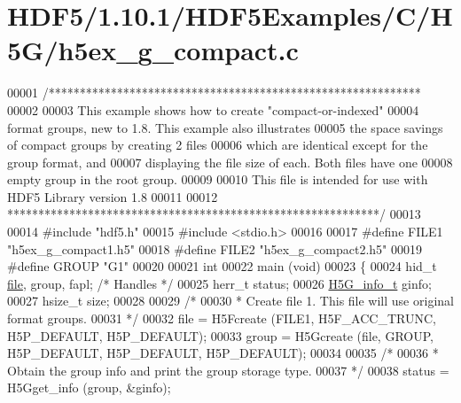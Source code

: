 \hypertarget{_h_d_f5_21_810_81_2_h_d_f5_examples_2_c_2_h5_g_2h5ex__g__compact_8c_source}{}\section{H\+D\+F5/1.10.1/\+H\+D\+F5\+Examples/\+C/\+H5\+G/h5ex\+\_\+g\+\_\+compact.c}
\label{_h_d_f5_21_810_81_2_h_d_f5_examples_2_c_2_h5_g_2h5ex__g__compact_8c_source}

\begin{DoxyCode}
00001 \textcolor{comment}{/************************************************************}
00002 \textcolor{comment}{}
00003 \textcolor{comment}{  This example shows how to create "compact-or-indexed"}
00004 \textcolor{comment}{  format groups, new to 1.8.  This example also illustrates}
00005 \textcolor{comment}{  the space savings of compact groups by creating 2 files}
00006 \textcolor{comment}{  which are identical except for the group format, and}
00007 \textcolor{comment}{  displaying the file size of each.  Both files have one}
00008 \textcolor{comment}{  empty group in the root group.}
00009 \textcolor{comment}{}
00010 \textcolor{comment}{  This file is intended for use with HDF5 Library version 1.8}
00011 \textcolor{comment}{}
00012 \textcolor{comment}{ ************************************************************/}
00013 
00014 \textcolor{preprocessor}{#include "hdf5.h"}
00015 \textcolor{preprocessor}{#include <stdio.h>}
00016 
00017 \textcolor{preprocessor}{#define FILE1       "h5ex\_g\_compact1.h5"}
00018 \textcolor{preprocessor}{#define FILE2       "h5ex\_g\_compact2.h5"}
00019 \textcolor{preprocessor}{#define GROUP       "G1"}
00020 
00021 \textcolor{keywordtype}{int}
00022 main (\textcolor{keywordtype}{void})
00023 \{
00024     hid\_t       \hyperlink{structfile}{file}, group, fapl;         \textcolor{comment}{/* Handles */}
00025     herr\_t      status;
00026     \hyperlink{struct_h5_g__info__t}{H5G\_info\_t}  ginfo;
00027     hsize\_t     size;
00028 
00029     \textcolor{comment}{/*}
00030 \textcolor{comment}{     * Create file 1.  This file will use original format groups.}
00031 \textcolor{comment}{     */}
00032     file = H5Fcreate (FILE1, H5F\_ACC\_TRUNC, H5P\_DEFAULT, H5P\_DEFAULT);
00033     group = H5Gcreate (file, GROUP, H5P\_DEFAULT, H5P\_DEFAULT, H5P\_DEFAULT);
00034 
00035     \textcolor{comment}{/*}
00036 \textcolor{comment}{     * Obtain the group info and print the group storage type.}
00037 \textcolor{comment}{     */}
00038     status = H5Gget\_info (group, &ginfo);

\end{DoxyCode}
